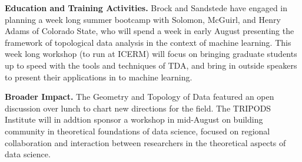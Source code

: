 {\bf Education and Training Activities.}
Brock and Sandstede have engaged in planning a week long summer bootcamp with Solomon, McGuirl, and Henry Adams of Colorado State, who will spend a week in early August presenting the framework of topological data analysis in the context of machine learning. This week long workshop (to run at ICERM) will focus on bringing graduate students up to speed with the tools and techniques of TDA, and bring in outside speakers to present their applications in to machine learning.

{\bf Broader Impact.} The Geometry and Topology of Data featured an open discussion over lunch to chart new directions for the field. The TRIPODS Institute will in addtion sponsor a workshop in mid-August on building community in theoretical foundations of data science, focused on regional collaboration and interaction between researchers in the theoretical aspects of data science.
